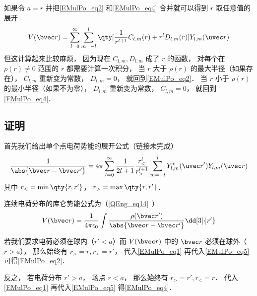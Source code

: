 如果令 $a = r$ 并把\autoref{EMulPo_eq2} 和\autoref{EMulPo_eq4} 合并就可以得到 $r$ 取任意值的展开
\begin{equation}
V(\bvec r) = \sum_{l = 0}^\infty\sum_{m = -l}^l \qty[\frac{1}{r^{l+1}} C_{l,m}(r) + r^l D_{l,m}(r)] Y_{l,m}(\uvec r)
\end{equation}
但这计算起来比较麻烦， 因为现在 $C_{l,m}, D_{l,m}$ 成了 $r$ 的函数， 对每个在 $\rho(r)\ne 0$ 范围的 $r$ 都需要计算一次积分， 当 $r$ 大于 $\rho(r)$ 的最大半径（如果存在）， $C_{l,m}$ 重新变为常数， $D_{l,m}= 0$， 就回到\autoref{EMulPo_eq2}． 当 $r$ 小于 $\rho(r)$ 的最小半径（如果不为零）， $D_{l,m}$ 重新变为常数， $C_{l,m} = 0$， 就回到\autoref{EMulPo_eq4}．

\subsection{证明}
首先我们给出单个点电荷势能的展开公式（链接未完成）
\begin{equation}\label{EMulPo_eq1}
\frac{1}{\abs{\bvec r - \bvec r'}} = 4\pi \sum_{l=0}^{\infty} \frac{1}{2l+1} \frac{r_<^l}{r_>^{l+1}} \sum_{m = -l}^l Y_{l,m}^*(\uvec r') Y_{l,m}(\uvec r)
\end{equation}
其中 $r_< = \min\qty{r, r'}$， $r_> = \max\qty{r, r'}$．

连续电荷分布的库仑势能公式为（\autoref{QEng_eq14}~）
\begin{equation}\label{EMulPo_eq5}
V(\bvec r) = \frac{1}{4\pi\epsilon_0}\int \frac{\rho(\bvec r')}{\abs{\bvec r - \bvec r'}} \dd[3]{r'}
\end{equation}

若我们要求电荷必须在球内（$r' < a$）而 $V(\bvec r)$ 中的 $\bvec r$ 必须在球外（$r > a$）， 那么始终有 $r_> = r, r_< = r'$， 代入\autoref{EMulPo_eq1} 再代入\autoref{EMulPo_eq5} 可得\autoref{EMulPo_eq2}．

反之， 若电荷分布 $r' > a$， 场点 $r < a$， 那么始终有 $r_> = r', r_< = r$． 代入\autoref{EMulPo_eq1} 再代入\autoref{EMulPo_eq5} 得\autoref{EMulPo_eq4}．

